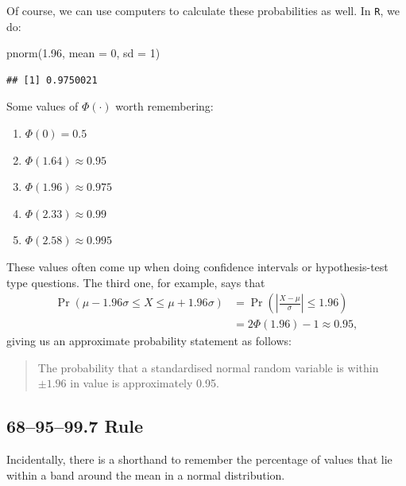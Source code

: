 \documentclass[
]{book}
\newenvironment{Shaded}{\begin{snugshade}}{\end{snugshade}}
\newcommand{\AttributeTok}[1]{\textcolor[rgb]{0.77,0.63,0.00}{#1}}
\newcommand{\DecValTok}[1]{\textcolor[rgb]{0.00,0.00,0.81}{#1}}
\newcommand{\FloatTok}[1]{\textcolor[rgb]{0.00,0.00,0.81}{#1}}
\newcommand{\FunctionTok}[1]{\textcolor[rgb]{0.00,0.00,0.00}{#1}}
\newcommand{\NormalTok}[1]{#1}
\providecommand{\tightlist}{%
  \setlength{\itemsep}{0pt}\setlength{\parskip}{0pt}}
\theoremstyle{definition}
\theoremstyle{definition}
\theoremstyle{definition}
\theoremstyle{definition}
\theoremstyle{remark}
\begin{document}
Of course, we can use computers to calculate these probabilities as well.
In \texttt{R}, we do:

\begin{Shaded}
\begin{Highlighting}[]
\FunctionTok{pnorm}\NormalTok{(}\FloatTok{1.96}\NormalTok{, }\AttributeTok{mean =} \DecValTok{0}\NormalTok{, }\AttributeTok{sd =} \DecValTok{1}\NormalTok{)}
\end{Highlighting}
\end{Shaded}

\begin{verbatim}
## [1] 0.9750021
\end{verbatim}

Some values of \(\Phi(\cdot)\) worth remembering:

\begin{enumerate}
\def\labelenumi{\arabic{enumi}.}
\tightlist
\item
  \(\Phi(0) = 0.5\)
\item
  \(\Phi(1.64) \approx 0.95\)
\item
  \(\Phi(1.96) \approx 0.975\)
\item
  \(\Phi(2.33) \approx 0.99\)
\item
  \(\Phi(2.58) \approx 0.995\)
\end{enumerate}

These values often come up when doing confidence intervals or hypothesis-test type questions.
The third one, for example, says that
\begin{align*}
\Pr(\mu- 1.96\sigma \leq X \leq \mu+ 1.96\sigma) 
&= \Pr\left( \left| \frac{X-\mu}{\sigma} \right| \leq 1.96 \right)\\
&= 2\Phi(1.96)-1\approx 0.95,
\end{align*}
giving us an approximate probability statement as follows:

\begin{quote}
The probability that a standardised normal random variable is within \(\pm 1.96\) in value is approximately 0.95.
\end{quote}

\hypertarget{rule}{%
\subsection{68--95--99.7 Rule}\label{rule}}

Incidentally, there is a shorthand to remember the percentage of values that lie within a band around the mean in a normal distribution.
\end{document}
